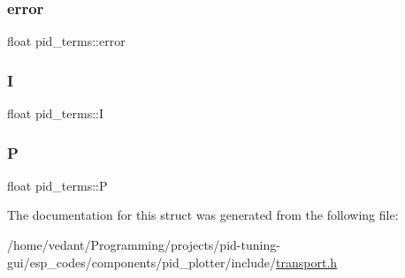 \mbox{\label{structpid__terms_a8073092d43a680432fa0f7784a7aef29}} 
\subsubsection{\texorpdfstring{error}{error}}
{\footnotesize\ttfamily float pid\+\_\+terms\+::error}

\mbox{\label{structpid__terms_af72ae69eaa9faeab7273dcbd847fdee9}} 
\subsubsection{\texorpdfstring{I}{I}}
{\footnotesize\ttfamily float pid\+\_\+terms\+::I}

\mbox{\label{structpid__terms_af930983320efcf1d96d3b7cb85fee908}} 
\subsubsection{\texorpdfstring{P}{P}}
{\footnotesize\ttfamily float pid\+\_\+terms\+::P}



The documentation for this struct was generated from the following file\+:\begin{DoxyCompactItemize}
\item 
/home/vedant/\+Programming/projects/pid-\/tuning-\/gui/esp\+\_\+codes/components/pid\+\_\+plotter/include/\hyperlink{transport_8h}{transport.\+h}\end{DoxyCompactItemize}
